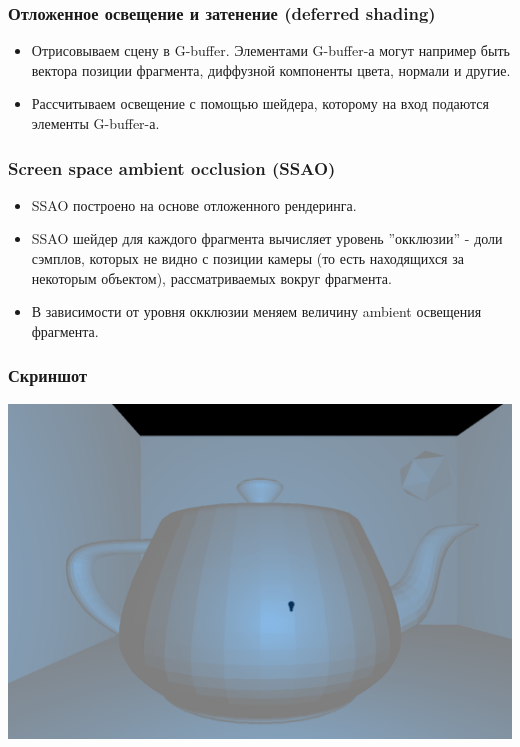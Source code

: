 \documentclass{beamer}
\begin{document}
\begin{frame}
	\frametitle{Отложенное освещение и затенение (deferred shading)}
	
	\begin{itemize}
		\item<1-> Отрисовываем сцену в G-buffer. Элементами G-buffer-а могут например быть вектора позиции фрагмента, диффузной компоненты цвета, нормали и другие.
		\item<1-> Рассчитываем освещение с помощью шейдера, которому на вход подаются элементы G-buffer-а.
	\end{itemize}
\end{frame}


\begin{frame}
	\frametitle{Screen space ambient occlusion (SSAO)}
	
	\begin{itemize}
		\item<1-> SSAO построено на основе отложенного рендеринга.
		\item<1-> SSAO шейдер для каждого фрагмента вычисляет уровень ''окклюзии'' - доли сэмплов, которых не видно с позиции камеры (то есть находящихся за некоторым объектом), рассматриваемых вокруг фрагмента.
		\item<1-> В зависимости от уровня окклюзии меняем величину ambient освещения фрагмента.  
	\end{itemize}
\end{frame}

\begin{frame}
	\frametitle{Скриншот}
	\begin{center}
		\includegraphics[scale=0.28]{scene6.png} 
	\end{center}
\end{frame}
\end{document}
